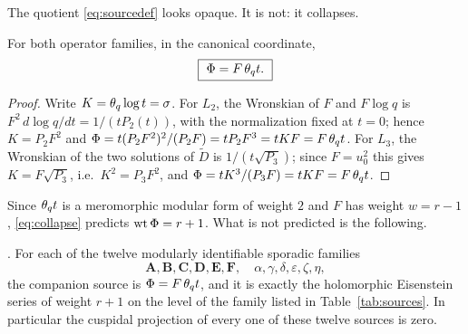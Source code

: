 The quotient \eqref{eq:sourcedef} looks opaque.  It is not: it collapses.

\begin{proposition}
\label{prop:collapse}
\Proved{} For both operator families, in the canonical coordinate,
\begin{equation}\label{eq:collapse}
\boxed{\ \Phi=F\,\theta_q t.\ }
\end{equation}
\end{proposition}

\begin{proof}
Write $K=\theta_q\log t=\sigma$.  For $L_2$, the Wronskian of $F$ and $F\log q$ is
$F^2\,d\log q/dt=1/(tP_2(t))$, with the normalization fixed at $t=0$; hence
$K=P_2F^2$ and
$\Phi=t(P_2F^2)^2/(P_2F)=tP_2F^3=tKF=F\,\theta_q t$.  For $L_3$, the Wronskian of
the two solutions of $\widetilde D$ is $1/(t\sqrt{P_3})$; since $F=u_0^2$ this
gives $K=F\sqrt{P_3}$, i.e.\ $K^2=P_3F^2$, and
$\Phi=tK^3/(P_3F)=tKF=F\,\theta_q t$.
\end{proof}

Since $\theta_q t$ is a meromorphic modular form of weight $2$ and $F$ has weight
$w=r-1$, \eqref{eq:collapse} predicts $\operatorname{wt}\Phi=r+1$.  What is not predicted is
the following.

\begin{namedthm}\label{thm:A}
\Proved{} \cite{ProjEisenstein}.  For each of the twelve modularly
identifiable sporadic families
\[
\mathbf A,\mathbf B,\mathbf C,\mathbf D,\mathbf E,\mathbf F,\quad
\alpha,\gamma,\delta,\varepsilon,\zeta,\eta,
\]
the companion source is $\Phi=F\,\theta_q t$, and it is exactly the holomorphic
Eisenstein series of weight $r+1$ on the level of the family listed in
Table~\ref{tab:sources}.  In particular the cuspidal projection of every one of
these twelve sources is zero.
\end{namedthm}


